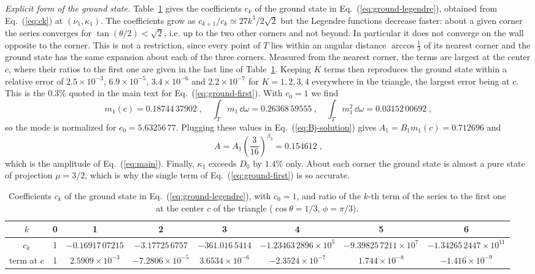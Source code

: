\emph{Explicit form of the ground state.} Table~\ref{S:tab-ck} gives the coefficients $c_k$ of the ground state in Eq.~(\ref{eq:ground-legendre}), obtained from Eq.~(\ref{eq:ck}) at $(\nu_1, \kappa_1)$. The coefficients grow as $c_{k+1}/c_k \simeq 27 k^3/2\sqrt{2}$ but the Legendre functions decrease faster: about a given corner the series converges for $\tan(\theta/2) < \sqrt{2}$, i.e. up to the two other corners and not beyond. In particular it does not converge on the wall opposite to the corner. This is not a restriction, since every point of $T$ lies within an angular distance $\arccos \frac{1}{3}$ of its nearest corner and the ground state has the same expansion about each of the three corners. Measured from the nearest corner, the terms are largest at the center $c$, where their ratios to the first one are given in the last line of Table~\ref{S:tab-ck}. Keeping $K$ terms then reproduces the ground state within a relative error of $2.5 \times 10^{-3}$, $6.9 \times 10^{-5}$, $3.4 \times 10^{-6}$ and $2.2 \times 10^{-7}$ for $K = 1, 2, 3, 4$ everywhere in the triangle, the largest error being at $c$. This is the $0.3\%$ quoted in the main text for Eq.~(\ref{eq:ground-first}). With $c_0 = 1$ we find
\begin{equation} \label{S:norms}
    m_1(c) = 0.18744\,37902 \;, \quad \int_T m_1 \, \dd \omega = 0.26368\,59555 \;, \quad \int_T m_1^2 \, \dd \omega = 0.03152\,00692 \;,
\end{equation}
so the mode is normalized for $c_0 = 5.63256\,77$. Plugging these values in Eq.~(\ref{eq:Bj-solution}) gives $A_1 = B_1 m_1(c) = 0.712696$ and
\begin{equation} \label{S:amplitude}
    A = A_1 \left( \frac{3}{16} \right)^{\beta_3} = 0.154612 \;,
\end{equation}
which is the amplitude of Eq.~(\ref{eq:main}). Finally, $\kappa_1$ exceeds $D_0$ by $1.4\%$ only. About each corner the ground state is almost a pure state of projection $\mu = 3/2$, which is why the single term of Eq.~(\ref{eq:ground-first}) is so accurate.

\begin{table}[h]
\caption{Coefficients $c_k$ of the ground state in Eq.~(\ref{eq:ground-legendre}), with $c_0 = 1$, and ratio of the $k$-th term of the series to the first one at the center $c$ of the triangle ($\cos \theta = 1/3$, $\phi = \pi/3$).}
\label{S:tab-ck}
\begin{ruledtabular}
\begin{tabular}{cccccccc}
$k$ & 0 & 1 & 2 & 3 & 4 & 5 & 6\\
\hline
$c_k$ & 1 & $-0.16917\,07215$ & $-3.17725\,6757$ & $-361.016\,5414$ & $-1.23463\,2896\times10^{5}$ & $-9.39825\,7211\times10^{7}$ & $-1.34265\,2447\times10^{11}$\\
term at $c$ & 1 & $2.5909\times10^{-3}$ & $-7.2806\times10^{-5}$ & $3.6534\times10^{-6}$ & $-2.3524\times10^{-7}$ & $1.744\times10^{-8}$ & $-1.416\times10^{-9}$\\
\end{tabular}
\end{ruledtabular}
\end{table}

